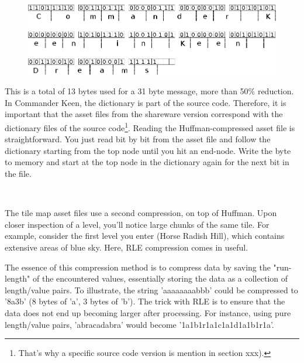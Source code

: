 \documentclass[book.tex]{subfiles}
\begin{document}
\begin{figure}[H]
\centering
 \includegraphics[width=\textwidth]{imgs/drawings/huffman_decode.eps}
 \end{figure}
 \par

This is a total of 13 bytes used for a 31 byte message, more than 50\% reduction. 
In Commander Keen, the dictionary is part of the source code. Therefore, it is important that the asset files from the shareware version correspond with the dictionary files of the source code\footnote{That's why a specific source code version is mention in section xxx).}. 
Reading the Huffman-compressed asset file is straightforward. You just read bit by bit from the asset file and follow the dictionary starting from the top node until you hit an end-node. Write the byte to memory and start at the top node in the dictionary again for the next bit in the file.\\

\par
\begin{minipage}{\textwidth}
 \par
 \end{minipage}\\

\par
The tile map asset files use a second compression, on top of Huffman. Upon closer inspection of a level, you'll notice large chunks of the same tile. For example, consider the first level you enter (Horse Radish Hill), which contains extensive areas of blue sky. Here, RLE compression comes in useful.\\

\par
The essence of this compression method is to compress data by saving the "run-length" of the encountered values, essentially storing the data as a collection of length/value pairs. To illustrate, the string 'aaaaaaaabbb' could be compressed to '8a3b' (8 bytes of 'a', 3 bytes of 'b'). The trick with RLE is to ensure that the data does not end up becoming larger after processing. For instance, using pure length/value pairs, 'abracadabra' would become '1a1b1r1a1c1a1d1a1b1r1a'.\\
\end{document}
